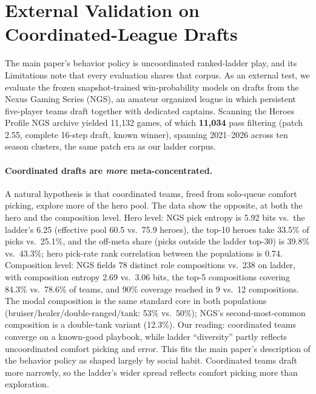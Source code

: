 \documentclass[journal]{IEEEtran}
\begin{document}
\section{External Validation on Coordinated-League Drafts}
\label{sec:ngs}

The main paper's behavior policy is uncoordinated ranked-ladder play, and its Limitations note that every evaluation shares that corpus. As an external test, we evaluate the frozen snapshot-trained win-probability models on drafts from the Nexus Gaming Series (NGS), an amateur organized league in which persistent five-player teams draft together with dedicated captains. Scanning the Heroes Profile NGS archive yielded 11{,}132 games, of which \textbf{11{,}034} pass filtering (patch 2.55, complete 16-step draft, known winner), spanning 2021--2026 across ten season clusters, the same patch era as our ladder corpus.

\paragraph{Coordinated drafts are \textit{more} meta-concentrated.} A natural hypothesis is that coordinated teams, freed from solo-queue comfort picking, explore more of the hero pool. The data show the opposite, at both the hero and the composition level. Hero level: NGS pick entropy is 5.92 bits vs.\ the ladder's 6.25 (effective pool 60.5 vs.\ 75.9 heroes), the top-10 heroes take 33.5\% of picks vs.\ 25.1\%, and the off-meta share (picks outside the ladder top-30) is 39.8\% vs.\ 43.3\%; hero pick-rate rank correlation between the populations is 0.74. Composition level: NGS fields 78 distinct role compositions vs.\ 238 on ladder, with composition entropy 2.69 vs.\ 3.06 bits, the top-5 compositions covering 84.3\% vs.\ 78.6\% of teams, and 90\% coverage reached in 9 vs.\ 12 compositions. The modal composition is the same standard core in both populations (bruiser/healer/double-ranged/tank: 53\% vs.\ 50\%); NGS's second-most-common composition is a double-tank variant (12.3\%). Our reading: coordinated teams converge on a known-good playbook, while ladder ``diversity'' partly reflects uncoordinated comfort picking and error. This fits the main paper's description of the behavior policy as shaped largely by social habit. Coordinated teams draft more narrowly, so the ladder's wider spread reflects comfort picking more than exploration.
\end{document}
